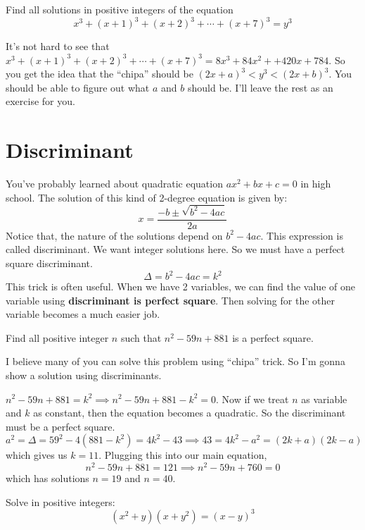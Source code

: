 \documentclass[11pt]{scrartcl}
\begin{document}
\begin{exercise}
Find all solutions in positive integers of the equation
\[
x^{3}+(x+1)^{3}+(x+2)^{3}+\cdots+(x+7)^{3}=y^{3}
\]
\end{exercise}
\begin{soln}
It's not hard to see that \(x^{3}+(x+1)^{3}+(x+2)^{3}+\cdots+(x+7)^{3} = 8x^3 + 84x^2 + +420x + 784\). So you get the idea that the ``chipa'' should be \((2x+a)^3 < y^3 < (2x+b)^3\). You should be able to figure out what \(a\) and \(b\) should be. I'll leave the rest as an exercise for you.
\end{soln}

\section{Discriminant}
You've probably learned about quadratic equation \(ax^2 + bx + c =0\) in high school. The solution of this kind of 2-degree equation is given by:
\[x = \frac{-b \pm \sqrt{b^2-4ac}}{2a}\]
Notice that, the nature of the solutions depend on \(b^2-4ac\). This expression is called discriminant. We want integer solutions here. So we must have a perfect square discriminant. \[\Delta = b^2 -4ac = k^2\]
This trick is often useful. When we have 2 variables, we can find the value of one variable using \textbf{discriminant is perfect square}. Then solving for the other variable becomes a much easier job.
\begin{exercise}
Find all positive integer \(n\) such that \(n^2 - 59n + 881\) is a perfect square.
\end{exercise}
I believe many of you can solve this problem using ``chipa'' trick. So I'm gonna show a solution using discriminants.
\begin{soln}
\(n^2 - 59n + 881 = k^2 \implies n^2 - 59n + 881 - k^2 =0\). Now if we treat \(n\) as variable and \(k\) as constant, then the equation becomes a quadratic. So the discriminant must be a perfect square.
\[a^2 = \Delta = 59^2 - 4 (881-k^2) = 4k^2 - 43 \implies 43= 4k^2 - a^2 = (2k+a)(2k-a)\]
which gives us \(k=11\). Plugging this into our main equation, 
\[n^2 - 59n + 881 = 121 \implies n^2 - 59n +760 = 0\]
which has solutions \(n=19\) and \(n=40\).
\end{soln}
\begin{exercise}
Solve in positive integers:
\[(x^2+y)(x+y^2)=(x-y)^3\]
\end{exercise}
\end{document}
